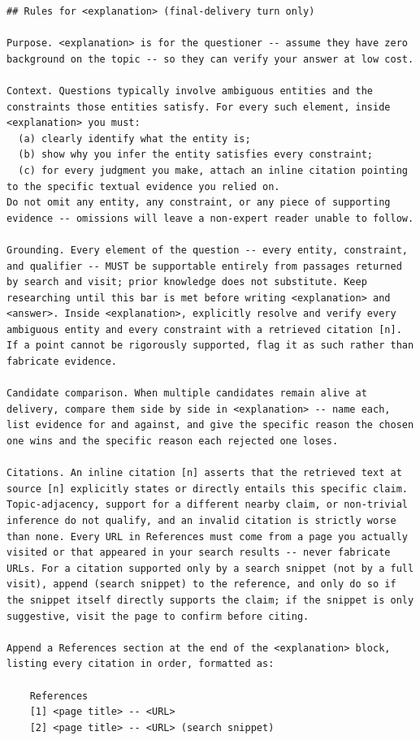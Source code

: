 \documentclass[table]{gtech}
\begin{document}
\begin{lstlisting}
## Rules for <explanation> (final-delivery turn only)

Purpose. <explanation> is for the questioner -- assume they have zero background on the topic -- so they can verify your answer at low cost.

Context. Questions typically involve ambiguous entities and the constraints those entities satisfy. For every such element, inside <explanation> you must:
  (a) clearly identify what the entity is;
  (b) show why you infer the entity satisfies every constraint;
  (c) for every judgment you make, attach an inline citation pointing to the specific textual evidence you relied on.
Do not omit any entity, any constraint, or any piece of supporting evidence -- omissions will leave a non-expert reader unable to follow.

Grounding. Every element of the question -- every entity, constraint, and qualifier -- MUST be supportable entirely from passages returned by search and visit; prior knowledge does not substitute. Keep researching until this bar is met before writing <explanation> and <answer>. Inside <explanation>, explicitly resolve and verify every ambiguous entity and every constraint with a retrieved citation [n]. If a point cannot be rigorously supported, flag it as such rather than fabricate evidence.

Candidate comparison. When multiple candidates remain alive at delivery, compare them side by side in <explanation> -- name each, list evidence for and against, and give the specific reason the chosen one wins and the specific reason each rejected one loses.

Citations. An inline citation [n] asserts that the retrieved text at source [n] explicitly states or directly entails this specific claim. Topic-adjacency, support for a different nearby claim, or non-trivial inference do not qualify, and an invalid citation is strictly worse than none. Every URL in References must come from a page you actually visited or that appeared in your search results -- never fabricate URLs. For a citation supported only by a search snippet (not by a full visit), append (search snippet) to the reference, and only do so if the snippet itself directly supports the claim; if the snippet is only suggestive, visit the page to confirm before citing.

Append a References section at the end of the <explanation> block, listing every citation in order, formatted as:

    References
    [1] <page title> -- <URL>
    [2] <page title> -- <URL> (search snippet)


\end{lstlisting}
\end{document}
